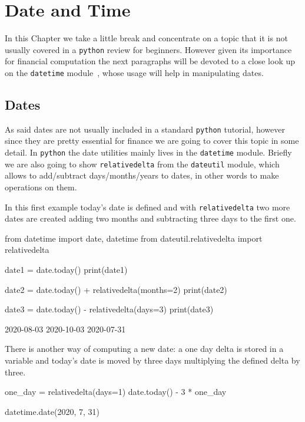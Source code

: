 \chapter{Date and Time}
\label{sec:datetime}

In this Chapter we take a little break and concentrate on a topic that it is not usually covered in a \texttt{python} review for beginners. However given its importance for financial computation the next paragraphs will be devoted to a close look up on the \texttt{datetime} module~\cite{bib:datetime}, whose usage will help in manipulating dates.

\section{Dates}\label{dates}

As said dates are not usually included in a standard \texttt{python} tutorial, however since they 
are pretty essential for finance we are going to cover this topic in some detail. 
In \texttt{python} the date utilities mainly lives in the \texttt{datetime} module. Briefly we are 
also going to show \texttt{relativedelta} from the \texttt{dateutil} module, which allows to 
add/subtract days/months/years to dates, in other words to make operations on them.

In this first example today's date is defined and with \texttt{relativedelta} two more dates are created 
adding two months and subtracting three days to the first one.

\begin{ipythonnon}
from datetime import date, datetime
from dateutil.relativedelta import relativedelta

date1 = date.today()
print(date1)

date2 = date.today() + relativedelta(months=2)
print(date2)

date3 = date.today() - relativedelta(days=3)
print(date3)
\end{ipythonnon}
\begin{ioutput}
2020-08-03
2020-10-03
2020-07-31
\end{ioutput}

There is another way of computing a new date: a one day delta is stored in a variable 
and today's date is moved by three days multiplying the defined delta by three.

\begin{ipythonnon}
one_day = relativedelta(days=1)
date.today() - 3 * one_day
\end{ipythonnon}
\begin{ioutput}
datetime.date(2020, 7, 31)
\end{ioutput}

